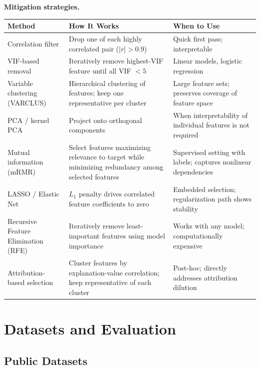 \documentclass[11pt]{article}
\begin{document}
\textbf{Mitigation strategies.}

\begin{center}
\small
\begin{tabular}{p{3cm}p{4.5cm}p{4.5cm}}
\toprule
\textbf{Method} & \textbf{How It Works} & \textbf{When to Use} \\
\midrule
Correlation filter & Drop one of each highly correlated pair ($|r|>0.9$) & Quick first pass; interpretable \\
VIF-based removal & Iteratively remove highest-VIF feature until all VIF $<5$ & Linear models, logistic regression \\
Variable clustering (VARCLUS) & Hierarchical clustering of features; keep one representative per cluster & Large feature sets; preserves coverage of feature space \\
PCA / kernel PCA & Project onto orthogonal components & When interpretability of individual features is not required \\
Mutual information (mRMR) & Select features maximizing relevance to target while minimizing redundancy among selected features & Supervised setting with labels; captures nonlinear dependencies \\
LASSO / Elastic Net & $L_1$ penalty drives correlated feature coefficients to zero & Embedded selection; regularization path shows stability \\
Recursive Feature Elimination (RFE) & Iteratively remove least-important features using model importance & Works with any model; computationally expensive \\
Attribution-based selection & Cluster features by explanation-value correlation; keep representative of each cluster & Post-hoc; directly addresses attribution dilution \\
\bottomrule
\end{tabular}
\end{center}

\section{Datasets and Evaluation}

\subsection{Public Datasets}
\end{document}
